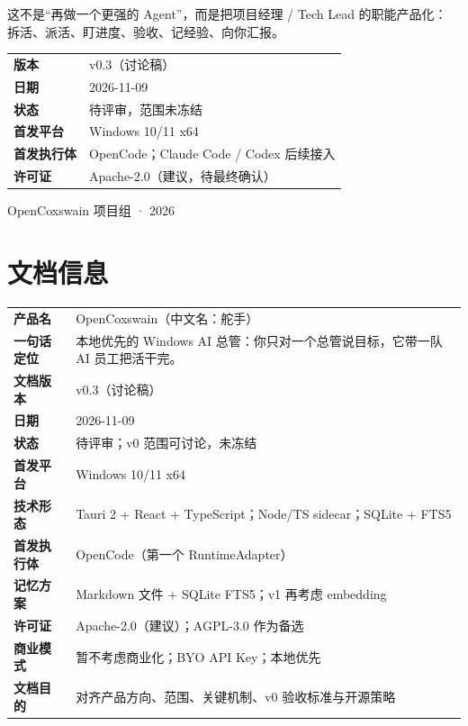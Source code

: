 \documentclass[UTF8,11pt,a4paper,fontset=windows]{ctexart}
\let\ocsection\section
\renewcommand{\section}{\Needspace{8\baselineskip}\ocsection}
\begin{document}
\begin{titlepage}
\vspace{0.6cm}
\begin{minipage}{0.82\linewidth}
\small\color{muted}
这不是“再做一个更强的 Agent”，而是把项目经理 / Tech Lead 的职能产品化：
拆活、派活、盯进度、验收、记经验、向你汇报。
\end{minipage}

\vfill
\noindent\begin{tabularx}{\linewidth}{@{}l X@{}}
\toprule
\textbf{版本} & v0.3（讨论稿） \\
\textbf{日期} & 2026-11-09 \\
\textbf{状态} & 待评审，范围未冻结 \\
\textbf{首发平台} & Windows 10/11 x64 \\
\textbf{首发执行体} & OpenCode；Claude Code / Codex 后续接入 \\
\textbf{许可证} & Apache-2.0（建议，待最终确认） \\
\bottomrule
\end{tabularx}

\vspace{0.8cm}
{\footnotesize\sffamily\color{muted} OpenCoxswain 项目组 · 2026}
\end{titlepage}
\setcounter{page}{2}

\section*{文档信息}

\noindent\begin{minipage}{\linewidth}
\centering
\small
\begin{tabularx}{\linewidth}{@{}p{3.2cm} X@{}}
\toprule
\textbf{产品名} & OpenCoxswain（中文名：舵手） \\
\textbf{一句话定位} & 本地优先的 Windows AI 总管：你只对一个总管说目标，它带一队 AI 员工把活干完。 \\
\textbf{文档版本} & v0.3（讨论稿） \\
\textbf{日期} & 2026-11-09 \\
\textbf{状态} & 待评审；v0 范围可讨论，未冻结 \\
\textbf{首发平台} & Windows 10/11 x64 \\
\textbf{技术形态} & Tauri 2 + React + TypeScript；Node/TS sidecar；SQLite + FTS5 \\
\textbf{首发执行体} & OpenCode（第一个 RuntimeAdapter） \\
\textbf{记忆方案} & Markdown 文件 + SQLite FTS5；v1 再考虑 embedding \\
\textbf{许可证} & Apache-2.0（建议）；AGPL-3.0 作为备选 \\
\textbf{商业模式} & 暂不考虑商业化；BYO API Key；本地优先 \\
\textbf{文档目的} & 对齐产品方向、范围、关键机制、v0 验收标准与开源策略 \\
\bottomrule
\end{tabularx}
\end{minipage}
\end{document}
